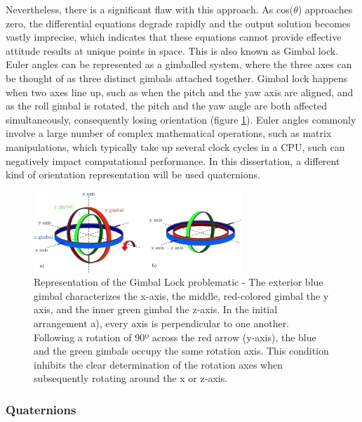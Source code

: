 Nevertheless, there is a significant flaw with this approach. As cos($\theta$) approaches zero, the differential equations degrade rapidly and the output solution becomes vastly imprecise, which indicates that these equations cannot provide effective attitude results at unique points in space. This is also known as Gimbal lock. Euler angles can be represented as a gimballed system, where the three axes can be thought of as three distinct gimbals attached together. Gimbal lock happens when two axes line up, such as when the pitch and the yaw axis are aligned, and as the roll gimbal is rotated, the pitch and the yaw angle are both affected simultaneously, consequently losing orientation (figure \ref{fig:gimbal_lock}).
Euler angles commonly involve a large number of complex mathematical operations, such as matrix manipulations, which typically take up several clock cycles in a CPU, such can negatively impact computational performance. In this dissertation, a different kind of orientation representation will be used quaternions.

\begin{figure}[!h]
    \centering
    \includegraphics[width=0.7\textwidth]{figures/gimbal_lock.png}
    \caption{Representation of the Gimbal Lock problematic \cite{zeitlhofler2019nominal} - The exterior blue gimbal characterizes the x-axis, the middle, red-colored gimbal the y axis, and the inner green gimbal the z-axis. In the initial arrangement a), every axis is perpendicular to one another. Following a rotation of 90º across the red arrow (y-axis), the blue and the green gimbals occupy the same rotation axis. This condition inhibits the clear determination of the rotation axes when subsequently rotating around the x or z-axis. }
    \label{fig:gimbal_lock}
\end{figure}

\subsubsection{Quaternions}

